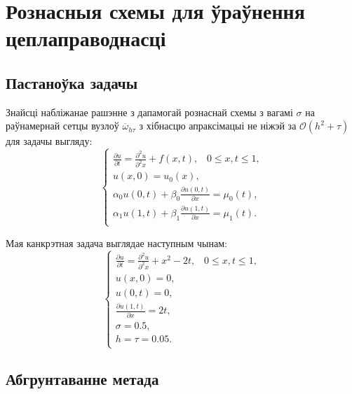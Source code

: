 \section{Рознасныя схемы для ўраўнення цеплаправоднасці}

\subsection*{Пастаноўка задачы}
Знайсці набліжанае рашэнне з дапамогай рознаснай схемы з вагамі $\sigma$ на раўнамернай сетцы вузлоў $\overline{\omega} _{h \tau }$ з хібнасцю апраксімацыі не ніжэй за $\mathcal{O}(h^2 + \tau)$ для задачы выгляду:
\begin{equation}
	\begin{cases}
		\frac{\partial u}{\partial t} = \frac{\partial ^2 u}{\partial ^2 x} + f(x,t), \hspace{10pt} 0 \le x,t \le 1,\\
		u(x,0) = u_0(x), \\
		\alpha _0 u(0,t) + \beta _0 \frac{\partial u(0,t)}{\partial x} = \mu _0(t), \\
		\alpha _1 u(1,t) + \beta _1 \frac{\partial u(1,t)}{\partial x} = \mu _1(t). \\
	\end{cases}
\end{equation}

Мая канкрэтная задача выглядае наступным чынам:
\begin{equation}
	\begin{cases}
		\frac{\partial u}{\partial t} = \frac{\partial ^2 u}{\partial ^2 x} + x^2 - 2t, \hspace{10pt} 0 \le x,t \le 1,\\
		u(x,0) = 0, \\
		u(0,t) = 0, \\
		\frac{\partial u(1,t)}{\partial x} = 2t, \\
        \sigma = 0.5,\\
        h = \tau = 0.05.\\
	\end{cases}
\end{equation}

\subsection*{Абгрунтаванне метада}

